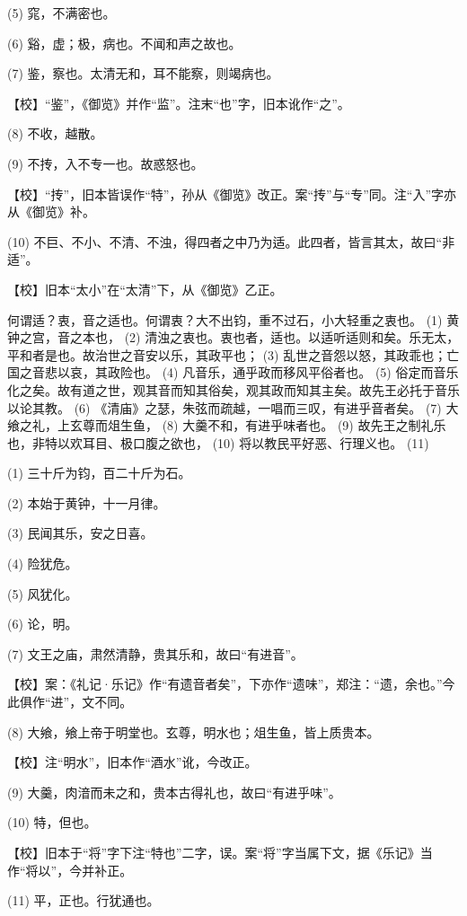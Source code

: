 \documentclass[12pt,UTF8]{ctexbook}
\begin{document}
(5) 窕，不满密也。

(6) 谿，虚；极，病也。不闻和声之故也。

(7) 鉴，察也。太清无和，耳不能察，则竭病也。

【校】“鉴”，《御览》并作“监”。注末“也”字，旧本讹作“之”。

(8) 不收，越散。

(9) 不抟，入不专一也。故惑怒也。

【校】“抟”，旧本皆误作“特”，孙从《御览》改正。案“抟”与“专”同。注“入”字亦从《御览》补。

(10) 不巨、不小、不清、不浊，得四者之中乃为适。此四者，皆言其太，故曰“非适”。

【校】旧本“太小”在“太清”下，从《御览》乙正。

何谓适？衷，音之适也。何谓衷？大不出钧，重不过石，小大轻重之衷也。 (1) 黄钟之宫，音之本也， (2) 清浊之衷也。衷也者，适也。以适听适则和矣。乐无太，平和者是也。故治世之音安以乐，其政平也； (3) 乱世之音怨以怒，其政乖也；亡国之音悲以哀，其政险也。 (4) 凡音乐，通乎政而移风平俗者也。 (5) 俗定而音乐化之矣。故有道之世，观其音而知其俗矣，观其政而知其主矣。故先王必托于音乐以论其教。 (6) 《清庙》之瑟，朱弦而疏越，一唱而三叹，有进乎音者矣。 (7) 大飨之礼，上玄尊而俎生鱼， (8) 大羹不和，有进乎味者也。 (9) 故先王之制礼乐也，非特以欢耳目、极口腹之欲也， (10) 将以教民平好恶、行理义也。 (11)

(1) 三十斤为钧，百二十斤为石。

(2) 本始于黄钟，十一月律。

(3) 民闻其乐，安之日喜。

(4) 险犹危。

(5) 风犹化。

(6) 论，明。

(7) 文王之庙，肃然清静，贵其乐和，故曰“有进音”。

【校】案：《礼记·乐记》作“有遗音者矣”，下亦作“遗味”，郑注：“遗，余也。”今此俱作“进”，文不同。

(8) 大飨，飨上帝于明堂也。玄尊，明水也；俎生鱼，皆上质贵本。

【校】注“明水”，旧本作“酒水”讹，今改正。

(9) 大羹，肉湆而未之和，贵本古得礼也，故曰“有进乎味”。

(10) 特，但也。

【校】旧本于“将”字下注“特也”二字，误。案“将”字当属下文，据《乐记》当作“将以”，今并补正。

(11) 平，正也。行犹通也。
\end{document}
